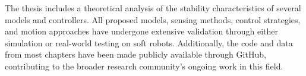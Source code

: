 The thesis includes a theoretical analysis of the stability characteristics of several models and controllers. All proposed models, sensing methods, control strategies, and motion approaches have undergone extensive validation through either simulation or real-world testing on soft robots. Additionally, the code and data from most chapters have been made publicly available through GitHub, contributing to the broader research community's ongoing work in this field.










